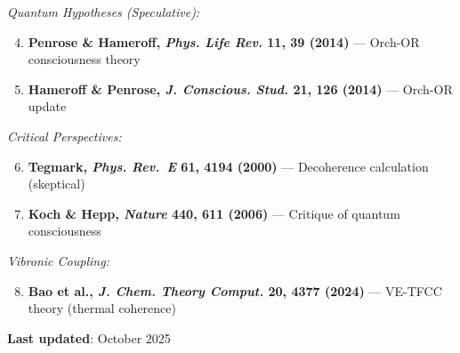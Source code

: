 \textit{Quantum Hypotheses (Speculative):}
\begin{enumerate}
\setcounter{enumi}{3}
\item \textbf{Penrose \& Hameroff, \emph{Phys. Life Rev.} 11, 39 (2014)} --- Orch-OR consciousness theory
\item \textbf{Hameroff \& Penrose, \emph{J. Conscious. Stud.} 21, 126 (2014)} --- Orch-OR update
\end{enumerate}

\textit{Critical Perspectives:}
\begin{enumerate}
\setcounter{enumi}{5}
\item \textbf{Tegmark, \emph{Phys. Rev.~E} 61, 4194 (2000)} --- Decoherence calculation (skeptical)
\item \textbf{Koch \& Hepp, \emph{Nature} 440, 611 (2006)} --- Critique of quantum consciousness
\end{enumerate}

\textit{Vibronic Coupling:}
\begin{enumerate}
\setcounter{enumi}{7}
\item \textbf{Bao et al., \emph{J. Chem. Theory Comput.} 20, 4377 (2024)} --- VE-TFCC theory (thermal coherence)
\end{enumerate}

\textbf{Last updated}: October 2025
